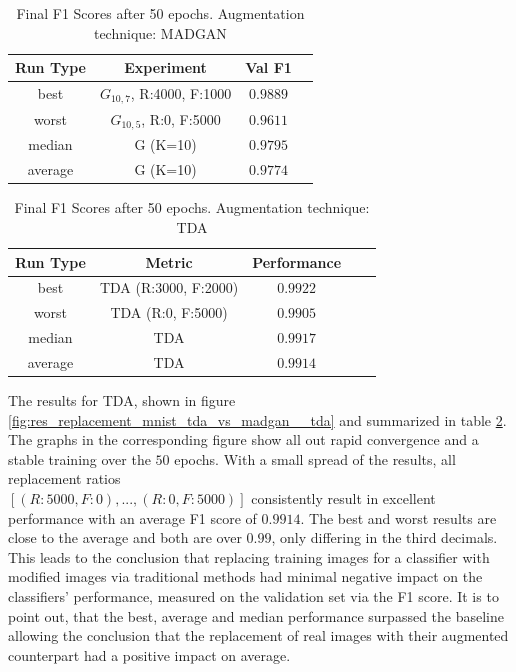 \begin{table}[H]
	\vspace{-1.5em}
	\centering
	\begin{tabular}{|c|c|c|c|}
		\hline
		Run Type & Experiment & Val F1 \\ \hline
		best & \(G_{10, 7}\), R:4000, F:1000 & $0.9889$\\ \hline
		worst & \(G_{10, 5}\), R:0, F:5000 & $0.9611$\\ \hline
		median & G (K=10) & $0.9795$\\ \hline
		average & G (K=10) & $0.9774$
		\\ \hline
	\end{tabular}
    \caption{Final F1 Scores after 50 epochs. Augmentation technique: MADGAN}
        \label{tab:res_replacement_mnist_tda_vs_madgan__madgan}
\end{table}
\begin{table}[H]
	\centering
	\vspace{-1.5em}
	\begin{tabular}{|c|c|c|c|c|}
		\hline
		Run Type & Metric & Performance \\ \hline
		best & TDA (R:3000, F:2000) & $0.9922$\\ \hline
		worst & TDA (R:0, F:5000) & $0.9905$\\ \hline
		median & TDA & $0.9917$\\ \hline
		average & TDA & $0.9914$
		\\ \hline
	\end{tabular}
    \caption{Final F1 Scores after 50 epochs. Augmentation technique: TDA}
        \label{tab:res_replacement_mnist_tda_vs_madgan__tda}
\end{table}

The results for TDA, shown in figure \ref{fig:res_replacement_mnist_tda_vs_madgan__tda} and summarized in table \ref{tab:res_replacement_mnist_tda_vs_madgan__tda}. The graphs in the corresponding figure show all out rapid convergence and a stable training over the $50$ epochs. With a small spread of the results, all replacement ratios \\\(\left[ (R:5000, F:0), ..., (R:0, F:5000) \right]\) consistently result in excellent performance with an average F1 score of $0.9914$. The best and worst results are close to the average and both are over $0.99$, only differing in the third decimals. This leads to the conclusion that replacing training images for a classifier with modified images via traditional methods had minimal negative impact on the classifiers' performance, measured on the validation set via the F1 score. It is to point out, that the best, average and median performance surpassed the baseline allowing the conclusion that the replacement of real images with their augmented counterpart had a positive impact on average.

